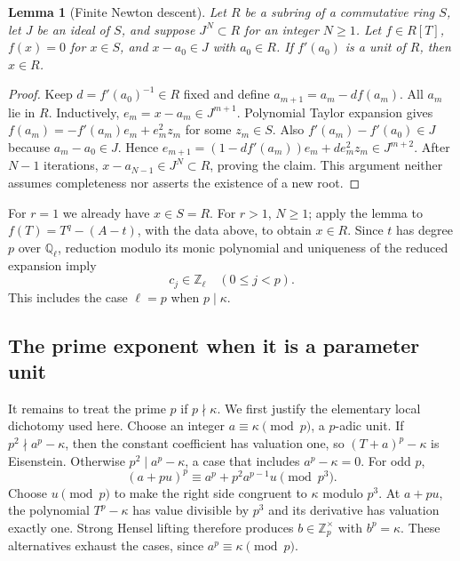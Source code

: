 \documentclass[11pt,letterpaper]{article}
\newtheorem{lemma}[theorem]{Lemma}
\theoremstyle{remark}\newtheorem{remark}[theorem]{Remark}
\newcommand{\Q}{\mathbb Q}
\newcommand{\Z}{\mathbb Z}
\begin{document}
\begin{lemma}[Finite Newton descent]\label{lem:newton}
Let $R$ be a subring of a commutative ring $S$, let $J$ be an ideal of $S$,
and suppose $J^N\subset R$ for an integer $N\ge1$.
Let $f\in R[T]$, $f(x)=0$ for $x\in S$, and $x-a_0\in J$ with $a_0\in R$.
If $f'(a_0)$ is a unit of $R$, then $x\in R$.
\end{lemma}
\begin{proof}
Keep $d=f'(a_0)^{-1}\in R$ fixed and define
$a_{m+1}=a_m-df(a_m)$. All $a_m$ lie in $R$.
Inductively, $e_m=x-a_m\in J^{m+1}$.
Polynomial Taylor expansion gives
$f(a_m)=-f'(a_m)e_m+e_m^2z_m$ for some $z_m\in S$.
Also $f'(a_m)-f'(a_0)\in J$ because $a_m-a_0\in J$.
Hence
$e_{m+1}=(1-df'(a_m))e_m+d e_m^2z_m\in J^{m+2}$.
After $N-1$ iterations, $x-a_{N-1}\in J^N\subset R$, proving the claim.
This argument neither assumes completeness nor asserts the existence of a
new root.
\end{proof}

For $r=1$ we already have $x\in S=R$. For $r>1$, $N\ge1$; apply
the lemma to $f(T)=T^q-(A-t)$, with the data above, to obtain $x\in R$.
Since $t$ has degree $p$ over $\Q_\ell$, reduction modulo its monic
polynomial and uniqueness of the reduced expansion imply
\begin{equation}\label{eq:paramcoords}
                              c_j\in\Z_\ell\quad(0\le j<p).
\end{equation}
This includes the case $\ell=p$ when $p\mid\kappa$.

\subsection{The prime exponent when it is a parameter unit}

It remains to treat the prime $p$ if $p\nmid\kappa$.
We first justify the elementary local dichotomy used here. Choose an
integer $a\equiv\kappa\pmod p$, a $p$-adic unit. If
$p^2\nmid a^p-\kappa$, then the constant coefficient has valuation one,
so $(T+a)^p-\kappa$ is Eisenstein. Otherwise $p^2\mid a^p-\kappa$,
a case that includes $a^p-\kappa=0$. For odd $p$,
\[
 (a+pu)^p\equiv a^p+p^2 a^{p-1}u\pmod{p^3}.
\]
Choose $u\pmod p$ to make the right side congruent to $\kappa$ modulo $p^3$.
At $a+pu$, the polynomial $T^p-\kappa$ has value divisible by $p^3$ and
its derivative has valuation exactly one. Strong Hensel lifting therefore
produces $b\in\Z_p^\times$ with $b^p=\kappa$.
These alternatives exhaust the cases, since $a^p\equiv\kappa\pmod p$.
\end{document}
